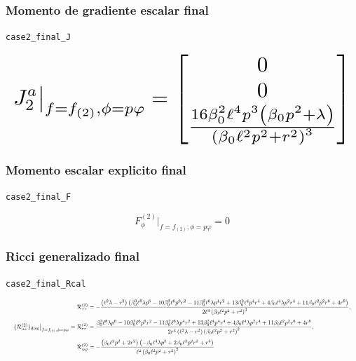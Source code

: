 \documentclass[11pt,a4paper]{article}
\begin{document}
\subsubsection{Momento de gradiente escalar final}

\noindent\texttt{case2\_final\_J}\par\nopagebreak[4]

\[
\resizebox{\textwidth}{!}{$\displaystyle J_2^a\big|_{f=f_{(2)},\phi=p\varphi} = \left[\begin{matrix}0\\0\\\frac{16 \beta_{0}^{2} \ell^{4} p^{3} \left(\beta_{0} p^{2} + \lambda\right)}{\left(\beta_{0} \ell^{2} p^{2} + r^{2}\right)^{3}}\end{matrix}\right]$}
\]

\subsubsection{Momento escalar explicito final}

\noindent\texttt{case2\_final\_F}\par\nopagebreak[4]

\[
F_\phi^{(2)}\big|_{f=f_{(2)},\phi=p\varphi} = 0
\]

\subsubsection{Ricci generalizado final}

\noindent\texttt{case2\_final\_Rcal}\par\nopagebreak[4]

\[
\resizebox{\textwidth}{!}{$\displaystyle \{\mathcal R^{(2)}_{aa}\}_{\rm diag}\big|_{f=f_{(2)},\phi=p\varphi} = \begin{aligned}&\mathcal R^{(2)}_{\tau\tau}=- \frac{\left(\ell^{2} \lambda - r^{2}\right) \left(\beta_{0}^{3} \ell^{8} \lambda p^{6} - 10 \beta_{0}^{3} \ell^{6} p^{6} r^{2} - 11 \beta_{0}^{2} \ell^{6} \lambda p^{4} r^{2} + 13 \beta_{0}^{2} \ell^{4} p^{4} r^{4} + 4 \beta_{0} \ell^{4} \lambda p^{2} r^{4} + 11 \beta_{0} \ell^{2} p^{2} r^{6} + 4 r^{8}\right)}{2 \ell^{4} \left(\beta_{0} \ell^{2} p^{2} + r^{2}\right)^{4}},\\[4pt]&\mathcal R^{(2)}_{rr}=\frac{\beta_{0}^{3} \ell^{8} \lambda p^{6} - 10 \beta_{0}^{3} \ell^{6} p^{6} r^{2} - 11 \beta_{0}^{2} \ell^{6} \lambda p^{4} r^{2} + 13 \beta_{0}^{2} \ell^{4} p^{4} r^{4} + 4 \beta_{0} \ell^{4} \lambda p^{2} r^{4} + 11 \beta_{0} \ell^{2} p^{2} r^{6} + 4 r^{8}}{2 r^{4} \left(\ell^{2} \lambda - r^{2}\right) \left(\beta_{0} \ell^{2} p^{2} + r^{2}\right)^{2}},\\[4pt]&\mathcal R^{(2)}_{\varphi\varphi}=- \frac{\left(\beta_{0} \ell^{2} p^{2} + 2 r^{2}\right) \left(- \beta_{0} \ell^{4} \lambda p^{2} + 2 \beta_{0} \ell^{2} p^{2} r^{2} + r^{4}\right)}{\ell^{2} \left(\beta_{0} \ell^{2} p^{2} + r^{2}\right)^{2}}\end{aligned}$}
\]
\end{document}
